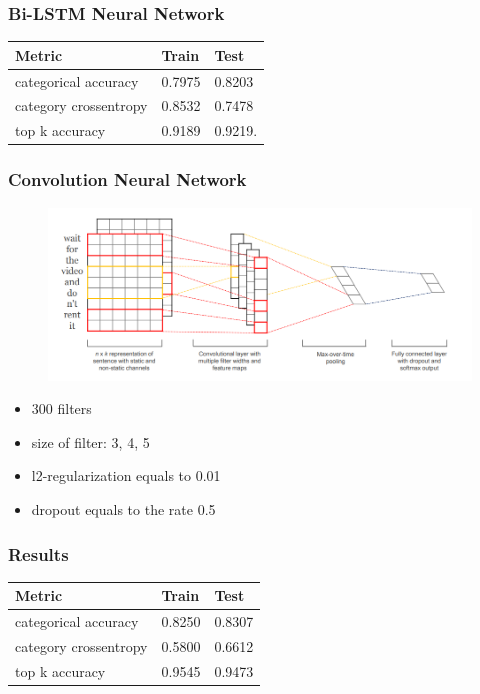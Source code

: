 \documentclass[14pt]{beamer}
\begin{document}
		
		\begin{frame}
			\frametitle{Bi-LSTM Neural Network}
			\begin{table}[h]
				\centering
				\begin{tabular}{| p{4cm} | p{3cm} | p{3cm} |}
					\hline
					\textbf{Metric}  & \textbf{Train} & \textbf{Test}                                                    
					\\ \hline
					categorical accuracy   &  0.7975 & 0.8203
					\\ \hline
					category crossentropy  &  0.8532 & 0.7478
					\\ \hline
					top k accuracy   &  0.9189 & 0.9219.
					\\ \hline		
				\end{tabular}
			\end{table}	
		\end{frame}
		
		
		\begin{frame}
			\frametitle{Convolution Neural Network }
			\begin{figure}[ht] 
				\center
				\includegraphics [scale=0.3] {CNN}
			\end{figure}
			\begin{itemize}
				\item 300 filters
				\item size of filter: 3, 4, 5
				\item l2-regularization equals to 0.01 
				\item dropout equals to the rate 0.5
			\end{itemize}	
		\end{frame}
		
		\begin{frame}
			\frametitle{Results}
			\begin{table}[h]
				\centering
				\begin{tabular}{| p{4cm} | p{3cm} | p{3cm} |}
					\hline
					\textbf{Metric}  & \textbf{Train} & \textbf{Test}                                                    
					\\ \hline
					categorical accuracy   &  0.8250 & 0.8307
					\\ \hline
					category crossentropy  &   0.5800 & 0.6612
					\\ \hline
					top k accuracy   &  0.9545 & 0.9473
					\\ \hline		
				\end{tabular}
			\end{table}
		\end{frame}
		
\end{document}
